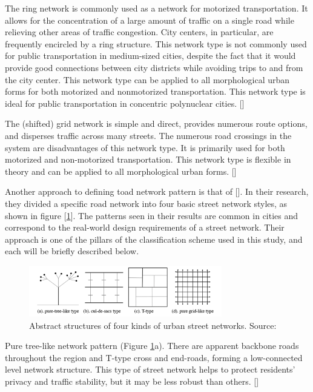 The ring network is commonly used as a network for motorized transportation. It allows for the concentration of a large amount of traffic on a single road while relieving other areas of traffic congestion. City centers, in particular, are frequently encircled by a ring structure. This network type is not commonly used for public transportation in medium-sized cities, despite the fact that it would provide good connections between city districts while avoiding trips to and from the city center. This network type can be applied to all morphological urban forms for both motorized and nonmotorized transportation. This network type is ideal for public transportation in concentric polynuclear cities. [\cite{Snellen:2002}]

The (shifted) grid network is simple and direct, provides numerous route options, and disperses traffic across many streets. The numerous road crossings in the system are disadvantages of this network type. It is primarily used for both motorized and non-motorized transportation. This network type is flexible in theory and can be applied to all morphological urban forms. [\cite{Snellen:2002}]

Another approach to defining toad network pattern is that of [\cite{Chan:2011,Lima:2015}]. In their research, they divided a specific road network into four basic street network styles, as shown in figure [\ref{fig:transportnetworks}]. The patterns seen in their results are common in cities and correspond to the real-world design requirements of a street network. Their approach is one of the pillars of the classification scheme used in this study, and each will be briefly described below.

\begin{figure}[!ht]
\centering
\includegraphics[width=0.75\textwidth,center]{picture/Cul de.png}
\caption[Abstract Structures of Four Kinds of Urban Street Networks]{Abstract structures of four kinds of urban street networks. Source: \cite{Han:2020}}
\label{fig:transportnetworks}
\end{figure}

Pure tree-like network pattern (Figure \ref{fig:transportnetworks}a). There are apparent backbone roads throughout the region and T-type cross and end-roads, forming a low-connected level network structure. This type of street network helps to protect residents' privacy and traffic stability, but it may be less robust than others. [\cite{Chan:2011,Lima:2015,Han:2020}]

